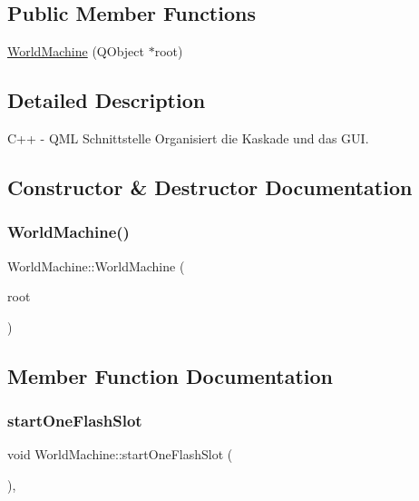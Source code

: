 \subsection*{Public Member Functions}
\begin{DoxyCompactItemize}
\item 
\mbox{\hyperlink{class_world_machine_abeca68557cc423c469cfbf09ad5c2640}{World\+Machine}} (Q\+Object $\ast$root)
\end{DoxyCompactItemize}


\subsection{Detailed Description}
C++ -\/ Q\+ML Schnittstelle Organisiert die Kaskade und das G\+UI. 

\subsection{Constructor \& Destructor Documentation}
\mbox{\label{class_world_machine_abeca68557cc423c469cfbf09ad5c2640}} 
\subsubsection{\texorpdfstring{World\+Machine()}{WorldMachine()}}
{\footnotesize\ttfamily World\+Machine\+::\+World\+Machine (\begin{DoxyParamCaption}\item[{Q\+Object $\ast$}]{root }\end{DoxyParamCaption})\hspace{0.3cm}{\ttfamily [inline]}}



\subsection{Member Function Documentation}
\mbox{\label{class_world_machine_a84f92960f72d17c1a5897072bf203996}} 
\subsubsection{\texorpdfstring{start\+One\+Flash\+Slot}{startOneFlashSlot}}
{\footnotesize\ttfamily void World\+Machine\+::start\+One\+Flash\+Slot (\begin{DoxyParamCaption}{ }\end{DoxyParamCaption})\hspace{0.3cm}{\ttfamily [inline]}, {\ttfamily [slot]}}

